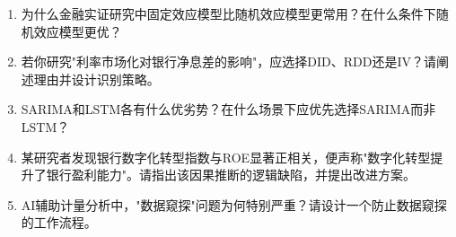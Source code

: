 \begin{exercisebox}[思考题]
\begin{enumerate}[leftmargin=2em]
  \item 为什么金融实证研究中固定效应模型比随机效应模型更常用？在什么条件下随机效应模型更优？
  \item 若你研究"利率市场化对银行净息差的影响"，应选择DID、RDD还是IV？请阐述理由并设计识别策略。
  \item SARIMA和LSTM各有什么优劣势？在什么场景下应优先选择SARIMA而非LSTM？
  \item 某研究者发现银行数字化转型指数与ROE显著正相关，便声称"数字化转型提升了银行盈利能力"。请指出该因果推断的逻辑缺陷，并提出改进方案。
  \item AI辅助计量分析中，"数据窥探"问题为何特别严重？请设计一个防止数据窥探的工作流程。
\end{enumerate}
\end{exercisebox}
